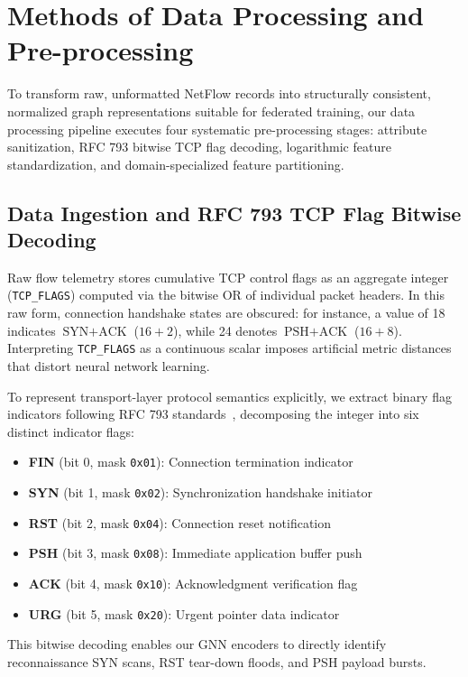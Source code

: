 \documentclass[12pt,a4paper]{report}
\begin{document}
\section{Methods of Data Processing and Pre-processing}\label{sec:preprocessing}

To transform raw, unformatted NetFlow records into structurally consistent, normalized graph representations suitable for federated training, our data processing pipeline executes four systematic pre-processing stages: attribute sanitization, RFC 793 bitwise TCP flag decoding, logarithmic feature standardization, and domain-specialized feature partitioning.

\subsection{Data Ingestion and RFC 793 TCP Flag Bitwise Decoding}
Raw flow telemetry stores cumulative TCP control flags as an aggregate integer (\texttt{TCP\_FLAGS}) computed via the bitwise OR of individual packet headers. In this raw form, connection handshake states are obscured: for instance, a value of 18 indicates $\text{SYN} + \text{ACK}$ ($16 + 2$), while 24 denotes $\text{PSH} + \text{ACK}$ ($16 + 8$). Interpreting \texttt{TCP\_FLAGS} as a continuous scalar imposes artificial metric distances that distort neural network learning.

To represent transport-layer protocol semantics explicitly, we extract binary flag indicators following RFC 793 standards~\cite{postel1981tcp}, decomposing the integer into six distinct indicator flags:
\begin{itemize}
    \item \textbf{FIN} (bit 0, mask \texttt{0x01}): Connection termination indicator
    \item \textbf{SYN} (bit 1, mask \texttt{0x02}): Synchronization handshake initiator
    \item \textbf{RST} (bit 2, mask \texttt{0x04}): Connection reset notification
    \item \textbf{PSH} (bit 3, mask \texttt{0x08}): Immediate application buffer push
    \item \textbf{ACK} (bit 4, mask \texttt{0x10}): Acknowledgment verification flag
    \item \textbf{URG} (bit 5, mask \texttt{0x20}): Urgent pointer data indicator
\end{itemize}
This bitwise decoding enables our GNN encoders to directly identify reconnaissance SYN scans, RST tear-down floods, and PSH payload bursts.
\end{document}
